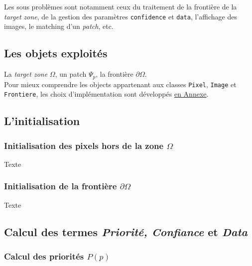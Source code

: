 \documentclass[12pt]{article}
\begin{document}
Les sous problèmes sont notamment ceux du traitement de la frontière de la \textit{target zone}, de la gestion des paramètres \texttt{confidence} et \texttt{data}, l'affichage des images, le matching d'un \textit{patch}, etc.

\subsection{Les objets exploités}

La \textit{target zone} $\Omega$, un patch $\Psi_p$, la frontière $\partial\Omega$. \\[0.3cm]

Pour mieux comprendre les objects appartenant aux classes \texttt{Pixel}, \texttt{Image} et \texttt{Frontiere}, les choix d'implémentation 
sont développés \hyperref[les-classes]{en Annexe}.

\subsection{L'initialisation}

\subsubsection{Initialisation des pixels hors de la zone $\Omega$}

Texte

\subsubsection{Initialisation de la frontière $\partial\Omega$}

Texte



\subsection{Calcul des termes \textit{Priorité, Confiance} et \textit{Data}}

\subsubsection{Calcul des priorités $P(p)$}
\end{document}
